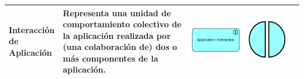 \begin{longtable}{|p{0.15\linewidth}|p{0.45\linewidth}|p{0.2\linewidth} p{0.2\linewidth}|}
    Interacción de Aplicación 
    &
    Representa una unidad de comportamiento colectivo de la aplicación realizada por (una colaboración de) dos o más componentes de la aplicación. 
    &
\begin{center}
    \includegraphics[width=1\linewidth]{imgs/capa_aplicacion/Aplication_interaction.pdf}
\end{center} &
\begin{center}
    \includegraphics[width=0.7\linewidth]{imgs/capa_aplicacion/interaction.pdf}
\end{center}
    \\ \hline


\end{longtable}
